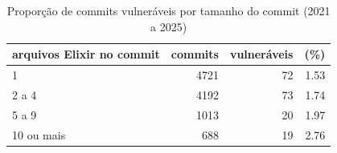 \begin{table}[htbp]
\centering
\caption{Proporção de commits vulneráveis por tamanho do commit (2021 a 2025)}
\label{tab:tamanho_vulneraveis}
\begin{tabular}{lrrr}
\toprule
arquivos Elixir no commit & commits & vulneráveis & (\%) \\
\midrule
1 & 4721 & 72 & 1.53 \\
2 a 4 & 4192 & 73 & 1.74 \\
5 a 9 & 1013 & 20 & 1.97 \\
10 ou mais & 688 & 19 & 2.76 \\
\bottomrule
\end{tabular}
\end{table}
